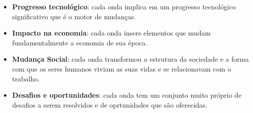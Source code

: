 \begin{itemize}
	\item \textbf{Progresso tecnológico}: cada onda implica em um progresso tecnológico significativo que é o motor de mudanças.
	\item \textbf{Impacto na economia}: cada onda insere elementos que mudam fundamentalmente a economia de sua época.
	\item \textbf{Mudança Social}: cada onda transformou a estrutura da sociedade e a forma com que os seres humanos viviam as suas vidas e se relacionavam com o trabalho.
	\item \textbf{Desafios e oportunidades}: cada onda tem um conjunto muito próprio de desafios a serem resolvidos e de oprtunidades que são oferecidas.
\end{itemize}

